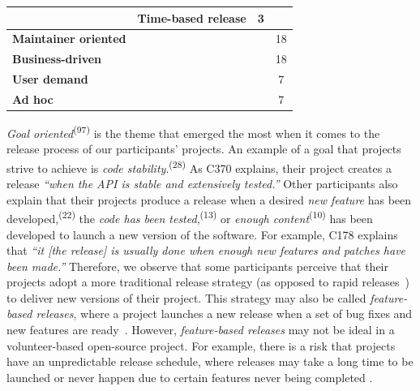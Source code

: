 \begin{table}
\begin{tabular}{p{8.915em}rrc}
		\cline{2-3}    \multicolumn{1}{c}{} & \multicolumn{1}{p{11.915em}}{Time-based release} & \multicolumn{1}{c}{3} &  \bigstrut\\
		\hline
		\textbf{Maintainer oriented} &       &       & 18 \bigstrut\\
		\hline
		\textbf{Business-driven} &       &       & 18 \bigstrut\\
		\hline
		\textbf{User demand} &       &       & 7 \bigstrut\\
		\hline
		\textbf{Ad hoc} &       &       & 7 \bigstrut\\
		\hline
	\end{tabular}%
	\label{tab:freq_citations_project_releasing_process}%
\end{table}%

\textit{Goal oriented}\textsuperscript{(97)} is the theme that emerged the most when it comes to the release process of our participants' projects. An example of a goal that projects strive to achieve is \textit{code stability}.\textsuperscript{(28)} As C370 explains, their project creates a release \textit{``when the API is stable and extensively tested.''} Other participants also explain that their projects produce a release when a desired \textit{new feature} has been developed,\textsuperscript{(22)} the \textit{code has been tested},\textsuperscript{(13)} or \textit{enough content}\textsuperscript{(10)} has been developed to launch a new version of the software. For example, C178 explains that \textit{``it [the release] is usually done when enough new features and patches have been made.''} 
Therefore, we observe that some participants perceive that their projects adopt a more traditional release strategy (as opposed to rapid releases~\citep{Da_Costa2016-cb}) to deliver new versions of their project. This strategy may also be called \textit{feature-based releases}, where a project launches a new release when a set of bug fixes and new features are ready~\citep{michlmayr2015and}. However, {\em feature-based releases} may not be ideal in a volunteer-based open-source project. For example, there is a risk that projects have an unpredictable release schedule, where releases may take a long time to be launched or never happen due to certain features never being completed \citep{michlmayr2015and}.

